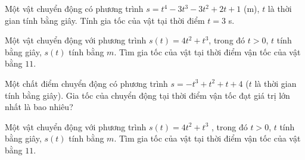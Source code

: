 \begin{ex}%
	Một vật chuyển động có phương trình $s=t^4-3t^3-3t^2+2t+1$ (m), $t$ là thời gian tính bằng giây. Tính gia tốc của vật tại  thời điểm $t=3$ s.
\end{ex}

\begin{ex}%
	Một vật chuyển động với phương  trình $s(t)=4t^2+t^3$, trong đó $t > 0$, $t$ tính bằng giây, $s(t)$ tính bằng $m$. Tìm gia tốc của vật tại thời điểm vận tốc của vật bằng $ 11 $.
\end{ex}

\begin{ex}%
	Một chất điểm chuyển động có phương trình $s=-t^3+t^2+t+4$ ($t$ là thời gian tính bằng giây). Gia tốc của chuyển động tại thời điểm vận tốc đạt giá trị lớn nhất  là bao nhiêu?
\end{ex}

\begin{ex}%
	Một vật chuyển động với phương trình $s(t)=4t^2+t^3$ , trong  đó $t > 0$, $t$ tính bằng giây, $s(t)$ tính bằng $m$. Tìm gia tốc của vật tại thời điểm vận tốc của vật bằng $ 11 $.
\end{ex}

